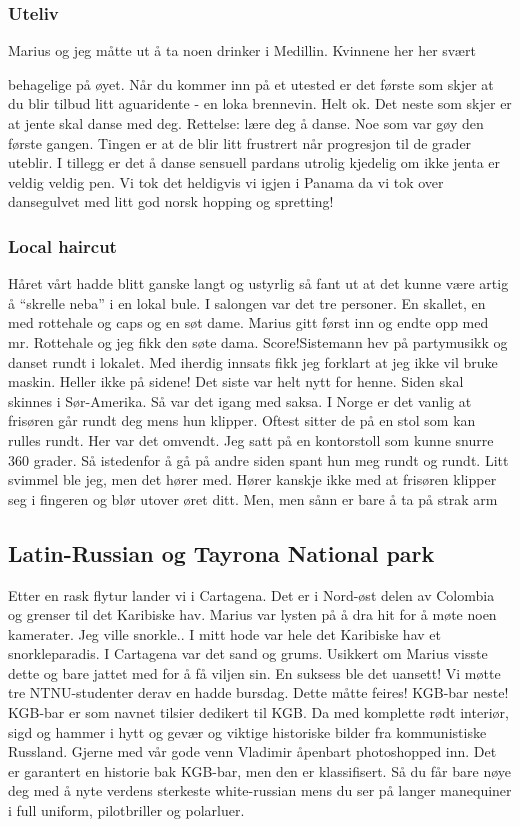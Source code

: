\subsubsection{Uteliv}

Marius og jeg måtte ut å ta noen drinker i Medillin. Kvinnene her her svært

behagelige på øyet. Når du kommer inn på et utested er det første som skjer
at du blir tilbud litt aguaridente - en loka brennevin. Helt ok. Det
neste som skjer er at jente skal danse med deg. Rettelse: lære deg å
danse. Noe som var gøy den første gangen. Tingen er at de blir litt
frustrert når progresjon til de grader uteblir. I tillegg er det
å danse sensuell pardans utrolig kjedelig om ikke jenta er veldig
veldig pen. Vi tok det heldigvis vi igjen i Panama da vi tok over
dansegulvet med litt god norsk hopping og spretting!

\subsubsection{Local haircut}

Håret vårt hadde blitt ganske langt og ustyrlig så fant ut  at det
kunne være artig å ``skrelle neba'' i en lokal bule. I salongen var
det tre personer. En skallet, en med rottehale og caps og en søt dame.
Marius gitt først inn og endte opp med mr. Rottehale og jeg fikk den søte
dama. Score!Sistemann hev på partymusikk og danset rundt i lokalet. Med
iherdig innsats fikk jeg forklart at jeg ikke vil bruke maskin. Heller
ikke på sidene! Det siste var helt nytt for henne. Siden skal skinnes
i Sør-Amerika. Så var det igang med saksa. I Norge er det vanlig at
frisøren går rundt deg mens hun klipper. Oftest sitter de på en stol
som kan rulles rundt. Her var det omvendt. Jeg satt på en kontorstoll
som kunne snurre 360 grader. Så istedenfor å gå på andre siden spant
hun meg rundt og rundt. Litt svimmel ble jeg, men det hører med.
Hører kanskje ikke med at frisøren klipper seg i fingeren og blør
utover øret ditt. Men, men sånn er bare å ta på strak arm

\subsection*{Latin-Russian og Tayrona National park}

Etter en rask flytur lander vi i Cartagena. Det er i Nord-øst delen
av Colombia og grenser til det Karibiske hav. Marius var lysten på å
dra hit for å møte noen kamerater. Jeg ville snorkle.. I mitt hode var hele det Karibiske hav et snorkleparadis. I
Cartagena var det sand og grums. Usikkert om Marius visste dette og
bare jattet med for å få viljen sin. En suksess ble det uansett! Vi møtte tre NTNU-studenter derav en
hadde bursdag. Dette måtte feires! KGB-bar neste! KGB-bar er som
navnet tilsier dedikert til KGB. Da med komplette rødt interiør,
sigd og hammer i hytt og gevær og viktige historiske bilder fra
kommunistiske Russland. Gjerne med vår gode venn Vladimir åpenbart
photoshopped inn. Det er garantert en historie bak KGB-bar, men den er
klassifisert. Så du får bare nøye deg med å nyte verdens sterkeste
white-russian mens du ser på langer manequiner i full uniform,
pilotbriller og polarluer. 


